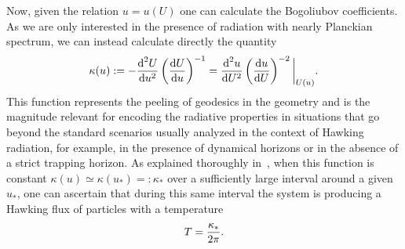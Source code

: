 \documentclass[12pt]{article}
\newcommand{\diff}{\text{d}}
\begin{document}
Now, given the relation $u=u(U)$ one can calculate the Bogoliubov coefficients. As we are only interested in the presence of radiation with nearly Planckian spectrum, we can instead calculate directly the quantity~\cite{barcelo-min,barcelo-gen}
%
\begin{equation}
\kappa (u) := -{\diff^2 U \over \diff u^2} \left({\diff U \over \diff u} \right)^{-1}={\diff^2 u \over \diff U^2} \left({\diff u \over \diff U} \right)^{-2}\bigg|_{U(u)}.
\end{equation}
%
This function represents the peeling of geodesics in the geometry and 
is the magnitude relevant for encoding the radiative properties in 
situations that go beyond the standard scenarios usually analyzed in the 
context of Hawking radiation, for example, in the presence of dynamical 
horizons or in the absence of a strict trapping horizon. As explained thoroughly in~\cite{barcelo-min,barcelo-gen}, when this function is constant $\kappa(u) \simeq \kappa (u_*)=:\kappa_*$ over a sufficiently large interval around a given $u_*$, one can ascertain that during this same interval the system is producing a Hawking flux of particles with a temperature
%
\begin{equation}
 T = {\kappa_* \over 2\pi}.
\label{hawking.temperature}
\end{equation}
%
\end{document}
